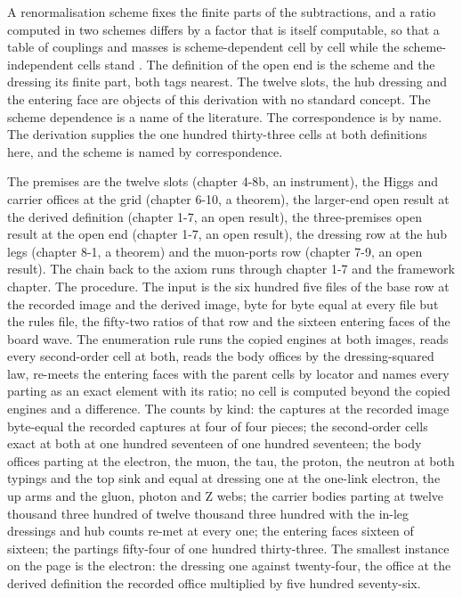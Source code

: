 \begin{chbridge}
A renormalisation scheme fixes the finite parts of the subtractions, and a ratio computed in two schemes differs by a factor that is itself computable, so that a table of couplings and masses is scheme-dependent cell by cell while the scheme-independent cells stand \cite{tHooftVeltman1972,Weinberg1973}.
The definition of the open end is the scheme and the dressing its finite part, both tags nearest. The twelve slots, the hub dressing and the entering face are objects of this derivation with no standard concept. The scheme dependence is a name of the literature. The correspondence is by name. The derivation supplies the one hundred thirty-three cells at both definitions here, and the scheme is named by correspondence.
\end{chbridge}
\begin{chproof}[instrument]
The premises are the twelve slots (chapter 4-8b, an instrument), the Higgs and carrier offices at the grid (chapter 6-10, a theorem), the larger-end open result at the derived definition (chapter 1-7, an open result), the three-premises open result at the open end (chapter 1-7, an open result), the dressing row at the hub legs (chapter 8-1, a theorem) and the muon-ports row (chapter 7-9, an open result). The chain back to the axiom runs through chapter 1-7 and the framework chapter. The procedure. The input is the six hundred five files of the base row at the recorded image and the derived image, byte for byte equal at every file but the rules file, the fifty-two ratios of that row and the sixteen entering faces of the board wave. The enumeration rule runs the copied engines at both images, reads every second-order cell at both, reads the body offices by the dressing-squared law, re-meets the entering faces with the parent cells by locator and names every parting as an exact element with its ratio; no cell is computed beyond the copied engines and a difference. The counts by kind: the captures at the recorded image byte-equal the recorded captures at four of four pieces; the second-order cells exact at both at one hundred seventeen of one hundred seventeen; the body offices parting at the electron, the muon, the tau, the proton, the neutron at both typings and the top sink and equal at dressing one at the one-link electron, the up arms and the gluon, photon and Z webs; the carrier bodies parting at twelve thousand three hundred of twelve thousand three hundred with the in-leg dressings and hub counts re-met at every one; the entering faces sixteen of sixteen; the partings fifty-four of one hundred thirty-three. The smallest instance on the page is the electron: the dressing one against twenty-four, the office at the derived definition the recorded office multiplied by five hundred seventy-six.


\end{chproof}
